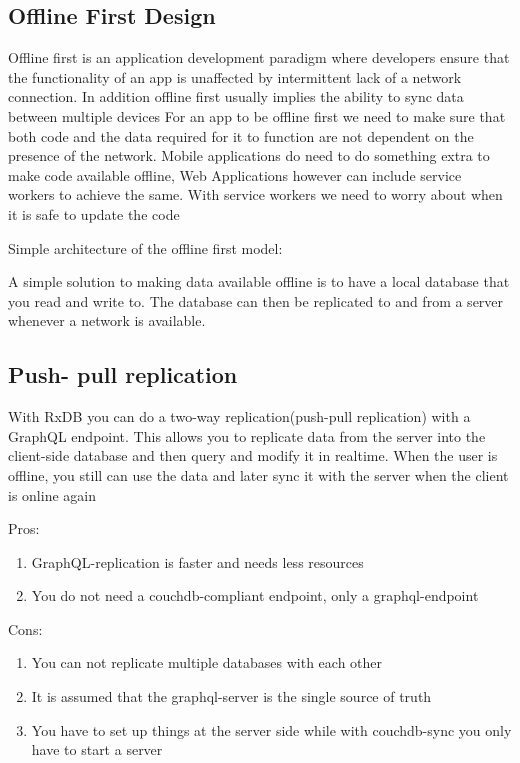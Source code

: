 \subsection{Offline First Design}

Offline first is an application development paradigm where developers ensure that the functionality of an app is unaffected by intermittent lack of a network connection. In addition offline first usually implies the ability to sync data between multiple devices
For an app to be offline first we need to make sure that both code and the data required for it to function are not dependent on the presence of the network.
Mobile applications do need to do something extra to make code available offline,
Web Applications however can include service workers to achieve the same.
With service workers we need to worry about when it is safe to update the code

Simple architecture of the offline first model:


A simple solution to making data available offline is to have a local database that you read and write to. The database can then be replicated to and from a server whenever a network is available.


\subsection{Push- pull replication}

With RxDB you can do a two-way replication(push-pull replication) with a GraphQL endpoint. This allows you to replicate data from the server into the client-side database and then query and modify it in realtime.
When the user is offline, you still can use the data and later sync it with the server when the client is online again

Pros:
\begin{enumerate}
    \item GraphQL-replication is faster and needs less resources
    \item You do not need a couchdb-compliant endpoint, only a graphql-endpoint
\end{enumerate}

Cons:
\begin{enumerate}
    \item You can not replicate multiple databases with each other
    \item It is assumed that the graphql-server is the single source of truth
    \item You have to set up things at the server side while with couchdb-sync you only have to start a server
\end{enumerate}

